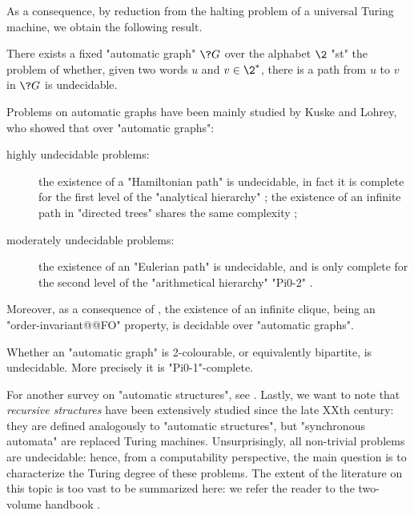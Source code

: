 As a consequence, by reduction from the halting problem of a universal Turing machine, 
we obtain the following result.
\begin{proposition}
	There exists a fixed "automatic graph" $\?G$ over the alphabet $\2$ "st"
	the problem of whether, given two words $u$ and $v \in \2^*$, there is a path from
	$u$ to $v$ in $\?G$ is undecidable.
\end{proposition}

Problems on automatic graphs have been mainly studied by Kuske and Lohrey, who showed that over "automatic graphs":
\begin{description}
	\item[highly undecidable problems:] the existence of a "Hamiltonian path"
		is undecidable, in fact it is complete for the first level of the "analytical hierarchy"
		\cite[Theorem~3.2]{KuskeLohrey2010AutomaticGraphs};
		the existence of an infinite path in "directed trees" shares the same complexity
		\cite[Theorem~3.6]{KuskeLohrey2010AutomaticGraphs};
	\item[moderately undecidable problems:]
		the existence of an "Eulerian path" is undecidable, and is only complete for
		the second level of the "arithmetical hierarchy" "Pi0-2" \cite[Theorem~4.13]{KuskeLohrey2010AutomaticGraphs}.
\end{description}

Moreover, as a consequence of , the existence of an infinite clique,
being an "order-invariant@@FO" property, is decidable over "automatic graphs".

\begin{proposition}
	Whether an "automatic graph" is 2-colourable, or equivalently bipartite, is undecidable.
	More precisely it is "Pi0-1"-complete.
\end{proposition}

For another survey on "automatic structures", see \cite{Gradel2020AutomaticStructures}.
Lastly, we want to note that \emph{recursive structures} have been extensively studied
since the late XXth century: they are defined analogously to "automatic structures",
but "synchronous automata" are replaced Turing machines.
Unsurprisingly, all non-trivial problems are undecidable: hence, from a computability perspective,
the main question is to characterize the Turing degree of these problems.
The extent of the literature on this topic is too vast to be summarized here:
we refer the reader to the two-volume handbook \cite{ErshovGoncharovNerodeRemmelMarek1998Handbook1,ErshovGoncharovNerodeRemmelMarek1998Handbook2}.